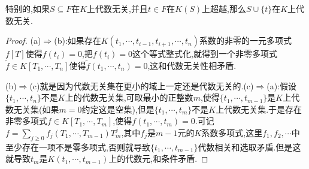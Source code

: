\begin{enumerate}
    特别的,如果$S\subseteq F$在$K$上代数无关,并且$t\in F$在$K(S)$上超越,那么$S\cup\{t\}$在$K$上代数无关.
    \begin{proof}
    	
    	(a)$\Rightarrow$(b):如果存在$K(t_1,\cdots,t_{i-1},t_{i+1},\cdots,t_n)$系数的非零的一元多项式$f[T]$使得$f(t_i)=0$,把$f(t_i)=0$这个等式整式化,就得到一个非零多项式$\widetilde{f}\in K[T_1,\cdots,T_n]$使得$\widetilde{f}(t_1,\cdots,t_n)=0$,这和代数无关性相矛盾.
    	
    	\qquad
    	
    	(b)$\Rightarrow$(c)就是因为代数无关集在更小的域上一定还是代数无关的.(c)$\Rightarrow$(a):假设$\{t_1,\cdots,t_n\}$不是$K$上的代数无关集,可取最小的正整数$m$,使得$\{t_1,\cdots,t_{m-1}\}$是$K$上代数无关集(如果$m=0$约定这是空集),但是$\{t_1,\cdots,t_m\}$不是$K$上代数无关集.于是存在非零多项式$f\in K[T_1,\cdots,T_m]$,使得$f(t_1,\cdots,t_m)=0$.可记$f=\sum_{j\ge0}f_j(T_1,\cdots,T_{m-1})T_m^j$,其中$f_j$是$m-1$元的$K$系数多项式,这里$f_1,f_2,\cdots$中至少存在一项不是零多项式,否则就导致$\{t_1,\cdots,t_{m-1}\}$代数相关和选取矛盾.但是这就导致$t_m$是$K(t_1,\cdots,t_{m-1})$上的代数元,和条件矛盾.
    \end{proof}
\end{enumerate}


